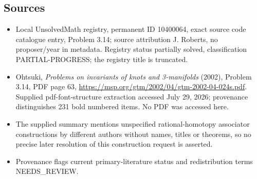 \documentclass[11pt]{article}
\begin{document}
\subsection{Sources}
\begin{itemize}
\item Local UnsolvedMath registry, permanent ID 10400064, exact source code catalogue entry, Problem 3.14; source attribution J. Roberts, no proposer/year in metadata. Registry status partially solved, classification PARTIAL-PROGRESS; the registry title is truncated.
\item Ohtsuki, \emph{Problems on invariants of knots and 3-manifolds} (2002), Problem 3.14, PDF page 63, \url{https://msp.org/gtm/2002/04/gtm-2002-04-024s.pdf}. Supplied pdf-font-structure extraction accessed July 29, 2026; provenance distinguishes 231 bold numbered items. No PDF was accessed here.
\item The supplied summary mentions unspecified rational-homotopy associator constructions by different authors without names, titles or theorems, so no precise later resolution of this construction request is asserted.
\item Provenance flags current primary-literature status and redistribution terms NEEDS\_REVIEW.
\end{itemize}
\end{document}
